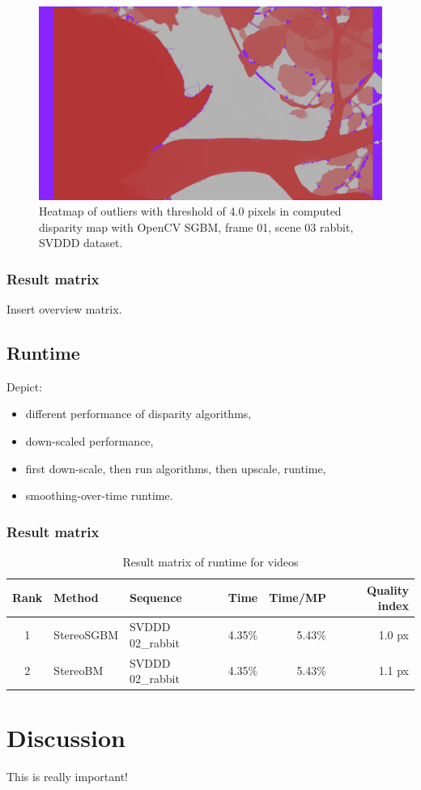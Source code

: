 \begin{figure}[h!]
  \centering
  \includegraphics[width=1.0\textwidth]{src/images/svddd-03-heatmap-outliers.png}
  \caption{Heatmap of outliers with threshold of 4.0 pixels in computed disparity map with OpenCV SGBM, frame 01, scene 03 rabbit, SVDDD dataset.}
  \label{fig:svddd-07}
\end{figure}

\subsubsection{Result matrix}

Insert overview matrix.

\subsection{Runtime}

Depict:

\begin{itemize}
  \item different performance of disparity algorithms,
  \item down-scaled performance,
  \item first down-scale, then run algorithms, then upscale, runtime,
  \item smoothing-over-time runtime.
\end{itemize}

\subsubsection{Result matrix}

\begin{landscape}
  \begin{table}[h!]
  \centering
  \begin{tabular}{cll|rrr}
    \hline
    \textbf{Rank} & \textbf{Method} & \textbf{Sequence} &  \textbf{Time} & \textbf{Time/MP} & \textbf{Quality index} \\ \hline \hline
    1 & StereoSGBM & SVDDD 02\_rabbit & 4.35\% & \cellcolor{green!60}5.43\% & 1.0 px \\
    2 & StereoBM & SVDDD 02\_rabbit & 4.35\% & 5.43\% & \cellcolor{red!60}1.1 px \\ \hline
  \end{tabular}
  \caption{Result matrix of runtime for videos}
  \label{tab:result-videos-runtime}
  \end{table}
\end{landscape}

\section{Discussion}

This is really important!


